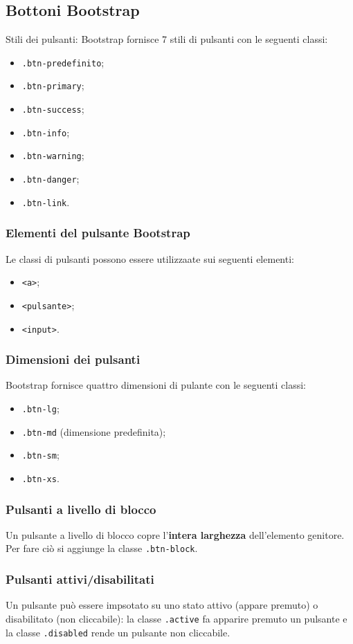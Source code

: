\documentclass{article}
\begin{document}
\subsection{Bottoni Bootstrap}
Stili dei pulsanti: Bootstrap fornisce 7 stili di pulsanti con le seguenti classi:
\begin{itemize}
    \item \texttt{.btn-predefinito};
    \item \texttt{.btn-primary};
    \item \texttt{.btn-success};
    \item \texttt{.btn-info};
    \item \texttt{.btn-warning};
    \item \texttt{.btn-danger};
    \item \texttt{.btn-link}.
\end{itemize}
\subsubsection{Elementi del pulsante Bootstrap}
Le classi di pulsanti possono essere utilizzaate sui seguenti elementi:
\begin{itemize}
    \item \texttt{<a>};
    \item \texttt{<pulsante>};
    \item \texttt{<input>}.
\end{itemize}
\subsubsection{Dimensioni dei pulsanti}
Bootstrap fornisce quattro dimensioni di pulante con le seguenti classi:
\begin{itemize}
    \item \texttt{.btn-lg};
    \item \texttt{.btn-md} (dimensione predefinita);
    \item \texttt{.btn-sm};
    \item \texttt{.btn-xs}.
\end{itemize}
\subsubsection{Pulsanti a livello di blocco}
Un pulsante a livello di blocco copre l'\textbf{intera larghezza} dell'elemento genitore. Per fare ciò si aggiunge la classe \texttt{.btn-block}.
\subsubsection{Pulsanti attivi/disabilitati}
Un pulsante può essere impsotato su uno stato attivo (appare premuto) o disabilitato (non cliccabile): la classe \texttt{.active} fa apparire premuto un pulsante e la classe \texttt{.disabled} rende un pulsante non cliccabile.
\end{document}
